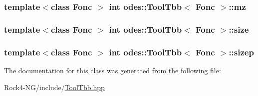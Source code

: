 \hypertarget{classodes_1_1ToolTbb_a012568dae6afffb573423821506f0cf7}{
\subsubsection[{mz}]{\setlength{\rightskip}{0pt plus 5cm}template$<$class Fonc $>$ int {\bf odes\-::\-Tool\-Tbb}$<$ Fonc $>$\-::mz\hspace{0.3cm}{\ttfamily [private]}}}\label{classodes_1_1ToolTbb_a012568dae6afffb573423821506f0cf7}
\hypertarget{classodes_1_1ToolTbb_a0d1270750a64754fa58e5538abb523cf}{
\subsubsection[{size}]{\setlength{\rightskip}{0pt plus 5cm}template$<$class Fonc $>$ int {\bf odes\-::\-Tool\-Tbb}$<$ Fonc $>$\-::size\hspace{0.3cm}{\ttfamily [private]}}}\label{classodes_1_1ToolTbb_a0d1270750a64754fa58e5538abb523cf}
\hypertarget{classodes_1_1ToolTbb_a4cd67d6bdcebe46c2b5b9ea79e2d8a3a}{
\subsubsection[{sizep}]{\setlength{\rightskip}{0pt plus 5cm}template$<$class Fonc $>$ int {\bf odes\-::\-Tool\-Tbb}$<$ Fonc $>$\-::sizep\hspace{0.3cm}{\ttfamily [private]}}}\label{classodes_1_1ToolTbb_a4cd67d6bdcebe46c2b5b9ea79e2d8a3a}


The documentation for this class was generated from the following file\-:\begin{DoxyCompactItemize}
\item 
Rock4-\/\-N\-G/include/\hyperlink{ToolTbb_8hpp}{Tool\-Tbb.\-hpp}\end{DoxyCompactItemize}
